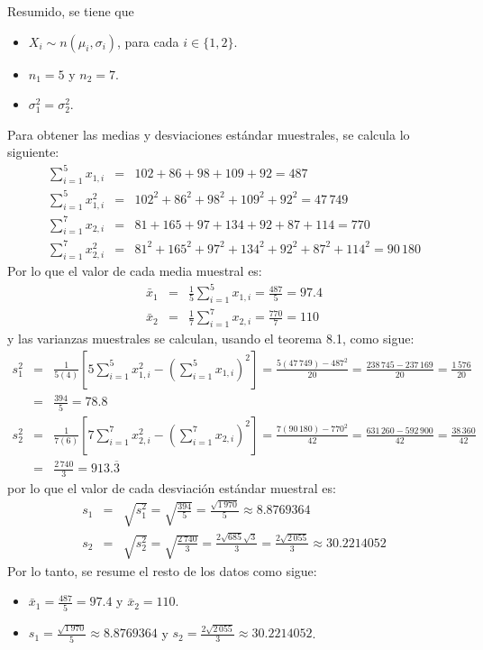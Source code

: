 \begin{solucion}
 \begin{datos}
  Resumido, se tiene que
  \begin{itemize}
   \item $X_i \sim n\left( \mu_i, \sigma_i \right)$,
   para cada $i \in \{ 1,2\}$.
   \item $n_1 = 5$ y $n_2 = 7$.
   \item $\sigma_1^2 = \sigma_2^2$.
  \end{itemize}
  Para obtener las medias y desviaciones est\'andar muestrales,
  se calcula lo siguiente:
  \begin{eqnarray*}
   \sum_{i=1}^5 x_{1,i} & = & 102 + 86 + 98 + 109 + 92 = 487 \\
   \sum_{i=1}^5 x_{1,i}^2 & = & 102^2 + 86^2 + 98^2 + 109^2 + 92^2
   = 47\,749 \\
   \sum_{i=1}^7 x_{2,i} & = & 81 + 165 + 97 + 134 + 92 + 87 + 114
   = 770 \\
   \sum_{i=1}^7 x_{2,i}^2 & = & 
   81^2 + 165^2 + 97^2 + 134^2 + 92^2 + 87^2 + 114^2 = 90\,180
  \end{eqnarray*}
  Por lo que el valor de cada media muestral es:
  \begin{eqnarray*}
   \bar{x}_1 & = & \frac{1}{5}\sum_{i=1}^5 x_{1,i} = \frac{487}{5}
   = 97.4 \\
   \bar{x}_2 & = & \frac{1}{7}\sum_{i=1}^7 x_{2,i} = \frac{770}{7}
   = 110
  \end{eqnarray*}
  y las varianzas muestrales se calculan, usando el teorema 8.1,
  como sigue:
  \begin{eqnarray*}
   s_1^2 & = &
   \frac{1}{5(4)}
   \left[
   5\sum_{i=1}^5 x_{1,i}^2 - \left( \sum_{i=1}^5 x_{1,i} \right)^2 \right]
   = \frac{5(47\,749) - 487^2}{20} = \frac{238\,745-237\,169}{20}
   = \frac{1\,576}{20} \\
   & = & \frac{394}{5} = 78.8 \\
   s_2^2 & = &
   \frac{1}{7(6)}
   \left[
   7\sum_{i=1}^7 x_{2,i}^2 - \left( \sum_{i=1}^7 x_{2,i} \right)^2
   \right]
   = \frac{7(90\,180) - 770^2}{42} = \frac{631\,260 - 592\,900}{42}
   = \frac{38\,360}{42} \\
   & = & \frac{2\,740}{3} = 913.\overline{3}
  \end{eqnarray*}
  por lo que el valor de cada desviaci\'on est\'andar muestral es:
  \begin{eqnarray*}
   s_1 & = & \sqrt{s_1^2} = \sqrt{\frac{394}{5}} =
   \frac{\sqrt{1\,970}}{5} \approx 8.8769364 \\
   s_2 & = & \sqrt{s_2^2} = \sqrt{\frac{2\,740}{3}}
   = \frac{2\sqrt{685}\sqrt{3}}{3} = \frac{2\sqrt{2\,055}}{3}
   \approx 30.2214052
  \end{eqnarray*}
  Por lo tanto, se resume el resto de los datos como sigue:
  \begin{itemize}
   \item $\bar{x}_1 = \frac{487}{5} = 97.4$ y $\bar{x}_2 = 110$.
   \item $s_1 = \frac{\sqrt{1\,970}}{5} \approx 8.8769364$
   y $s_2 = \frac{2\sqrt{2\,055}}{3} \approx 30.2214052$.
  \end{itemize}
 \end{datos}


\end{solucion}
